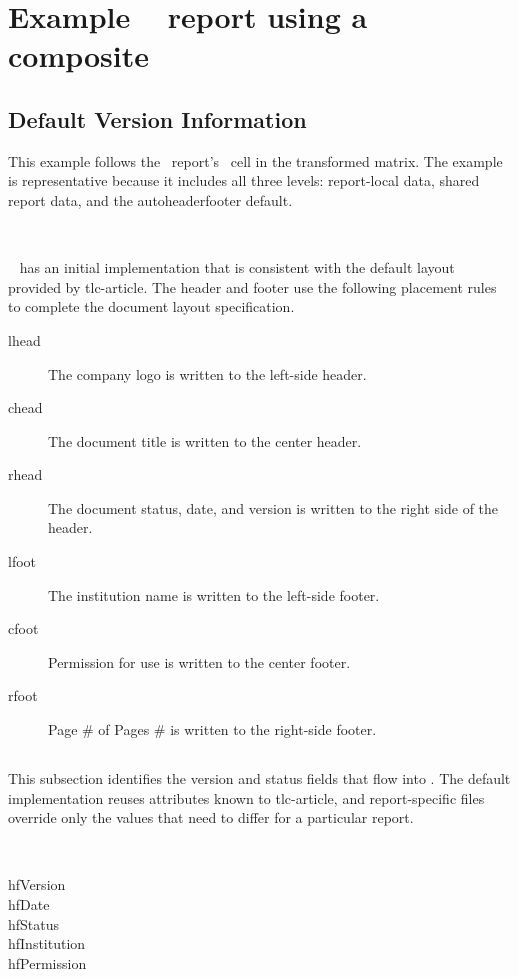 \documentclass[11pt]{tlc-article}
\begin{document}
\section{Example \rdName~ report using a composite \fdName}
\subsection{Default Version Information}

This example follows the \rdName\ report's \fdName\ cell in the transformed
matrix. The example is representative because it includes all three levels:
report-local data, shared report data, and the autoheaderfooter default.

\tlcVspace\

\faName~ has an initial implementation that is consistent with the default
layout provided by tlc-article. The header and footer use the following
placement rules to complete the document layout specification.

\begin{description}
  \item[lhead] The company logo is written to the left-side header.
  \item[chead] The document title is written to the center header.
  \item[rhead] The document status, date, and version is written to the right
    side of the header.
  \item[lfoot] The institution name is written to the left-side footer.
  \item[cfoot] Permission for use is written to the center footer.
  \item[rfoot] Page \# of Pages \# is written to the right-side footer.
\end{description}

\subsection{\fdName}
This subsection identifies the version and status fields that flow into
\fdName. The default implementation reuses attributes known to tlc-article, and
report-specific files override only the values that need to differ for a
particular \gls{report}.

\tlcVspace\

\begin{description}
  \item[hfVersion] \hfVersion
  \item[hfDate] \hfDate
  \item[hfStatus] \hfStatus
  \item[hfInstitution] \hfInstitution
  \item[hfPermission] \hfPermission
\end{description}
\end{document}
